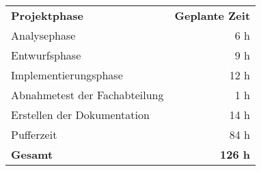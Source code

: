 \begin{tabular}{lr}
\rowcolor{heading}\textbf{Projektphase} & \textbf{Geplante Zeit} \\
Analysephase & 6 h \\
\rowcolor{odd}Entwurfsphase & 9 h \\
Implementierungsphase & 12 h \\
\rowcolor{odd}Abnahmetest der Fachabteilung & 1 h \\
Erstellen der Dokumentation & 14 h \\
\rowcolor{odd}Pufferzeit & 84 h \\
\hline
\hline
\textbf{Gesamt} & \textbf{126 h} \\
\end{tabular}
